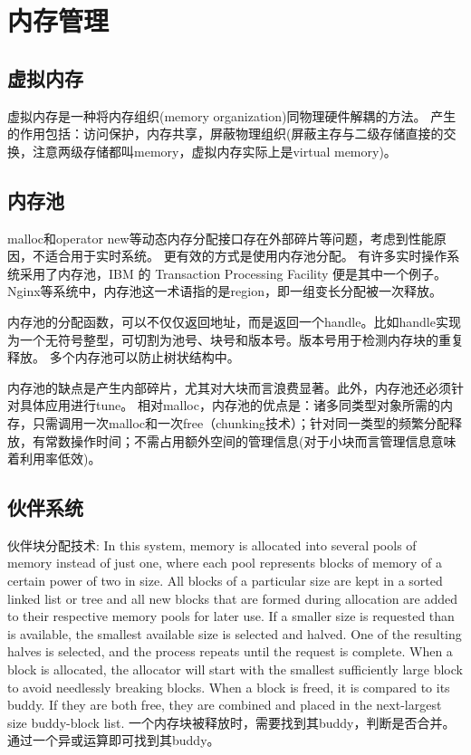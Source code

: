 \section{内存管理}
\subsection{虚拟内存}
虚拟内存是一种将内存组织(memory organization)同物理硬件解耦的方法。
产生的作用包括：访问保护，内存共享，屏蔽物理组织(屏蔽主存与二级存储直接的交换，注意两级存储都叫memory，虚拟内存实际上是virtual memory)。

\subsection{内存池}
malloc和operator new等动态内存分配接口存在外部碎片等问题，考虑到性能原因，不适合用于实时系统。
更有效的方式是使用内存池分配。
有许多实时操作系统采用了内存池，IBM 的 Transaction Processing Facility 便是其中一个例子。
Nginx等系统中，内存池这一术语指的是region，即一组变长分配被一次释放。

内存池的分配函数，可以不仅仅返回地址，而是返回一个handle。比如handle实现为一个无符号整型，可切割为池号、块号和版本号。版本号用于检测内存块的重复释放。
多个内存池可以防止树状结构中。

内存池的缺点是产生内部碎片，尤其对大块而言浪费显著。此外，内存池还必须针对具体应用进行tune。
相对malloc，内存池的优点是：诸多同类型对象所需的内存，只需调用一次malloc和一次free（chunking技术）；针对同一类型的频繁分配释放，有常数操作时间；不需占用额外空间的管理信息(对于小块而言管理信息意味着利用率低效)。

\subsection{伙伴系统}
伙伴块分配技术:
In this system, memory is allocated into several pools of memory instead of just one, where each pool represents blocks of memory of a certain power of two in size. All blocks of a particular size are kept in a sorted linked list or tree and all new blocks that are formed during allocation are added to their respective memory pools for later use. If a smaller size is requested than is available, the smallest available size is selected and halved. One of the resulting halves is selected, and the process repeats until the request is complete. When a block is allocated, the allocator will start with the smallest sufficiently large block to avoid needlessly breaking blocks. When a block is freed, it is compared to its buddy. If they are both free, they are combined and placed in the next-largest size buddy-block list.
一个内存块被释放时，需要找到其buddy，判断是否合并。通过一个异或运算即可找到其buddy。

